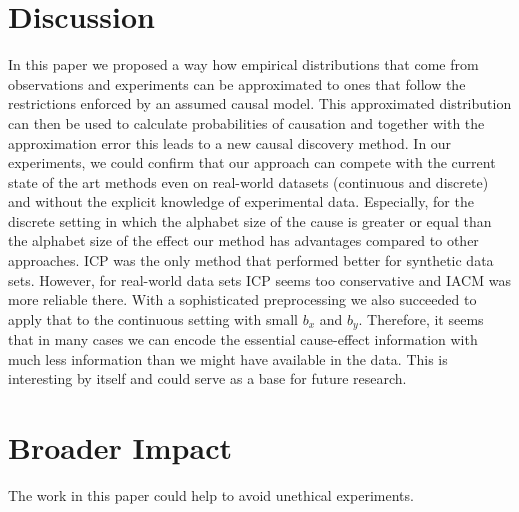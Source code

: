 \documentclass[letterpaper]{article}
\begin{document}
\section{Discussion} \label{sec.discussion}

In this paper we proposed a way how empirical distributions that come from observations and experiments can be approximated to ones that follow the restrictions enforced by an assumed causal model. This approximated distribution can then be used to calculate probabilities of causation and together with the approximation error this leads to a new causal discovery method. In our experiments, we could confirm that our approach can compete with the current state of the art methods even on real-world datasets (continuous and discrete) and without the explicit knowledge of experimental data. Especially, for the discrete setting in which the alphabet size of the cause is greater or equal than the alphabet size of the effect our method has advantages compared to other approaches. ICP was the only method that performed better for synthetic data sets. However, for real-world data sets ICP seems too conservative and IACM was more reliable there. With a sophisticated preprocessing we also succeeded to apply that to the continuous setting with small $b_x$ and $b_y$. Therefore, it seems that in many cases we can encode the essential cause-effect information with much less information than we might have available in the data. This is interesting by itself and could serve as a base for future research.

\section*{Broader Impact}

The work in this paper could help to avoid unethical experiments.



\end{document}
